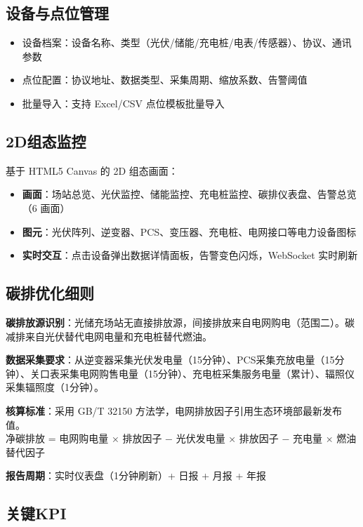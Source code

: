 \documentclass[12pt,a4paper]{ctexart}
\begin{document}
\subsection{设备与点位管理}
\begin{itemize}
  \item 设备档案：设备名称、类型（光伏/储能/充电桩/电表/传感器）、协议、通讯参数
  \item 点位配置：协议地址、数据类型、采集周期、缩放系数、告警阈值
  \item 批量导入：支持 Excel/CSV 点位模板批量导入
\end{itemize}

\subsection{2D组态监控}

基于 HTML5 Canvas 的 2D 组态画面：
\begin{itemize}
  \item \textbf{画面}：场站总览、光伏监控、储能监控、充电桩监控、碳排仪表盘、告警总览（6 画面）
  \item \textbf{图元}：光伏阵列、逆变器、PCS、变压器、充电桩、电网接口等电力设备图标
  \item \textbf{实时交互}：点击设备弹出数据详情面板，告警变色闪烁，WebSocket 实时刷新
\end{itemize}

\subsection{碳排优化细则}
\label{sec:carbon}

\textbf{碳排放源识别}：光储充场站无直接排放源，间接排放来自电网购电（范围二）。碳减排来自光伏替代电网电量和充电桩替代燃油。

\textbf{数据采集要求}：从逆变器采集光伏发电量（15分钟）、PCS采集充放电量（15分钟）、关口表采集电网购售电量（15分钟）、充电桩采集服务电量（累计）、辐照仪采集辐照度（1分钟）。

\textbf{核算标准}：采用 GB/T 32150 方法学，电网排放因子引用生态环境部最新发布值。\\
净碳排放 = 电网购电量 × 排放因子 − 光伏发电量 × 排放因子 − 充电量 × 燃油替代因子

\textbf{报告周期}：实时仪表盘（1分钟刷新）+ 日报 + 月报 + 年报

\subsection{关键KPI}
\end{document}
